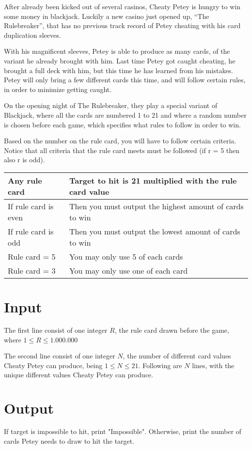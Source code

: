 
After already been kicked out of several casinos, Cheaty Petey is hungry to win some money in blackjack. Luckily a new casino just opened up, “The Rulebreaker”, that has no previous track record of Petey cheating with his card duplication sleeves.

With his magnificent sleeves, Petey is able to produce as many cards, of the variant he already brought with him. Last time Petey got caught cheating, he brought a full deck with him, but this time he has learned from his mistakes. Petey will only bring a few different cards this time, and will follow certain rules, in order to minimize getting caught.

On the opening night of The Rulebreaker, they play a special variant of Blackjack, where all the cards are numbered 1 to 21 and where a random number is chosen before each game, which specifies what rules to follow in order to win. 

Based on the number on the rule card, you will have to follow certain criteria. Notice that all criteria that the rule card meets must be followed (if r = 5 then also r is odd). 


\begin{tabular}{|ll|}
\hline
\textbf{Any rule card} & \textbf{Target to hit is 21 multiplied with the rule card value} \\ \hline
If rule card is even & Then you must output the highest amount of cards to win \\ \hline
If rule card is odd   & Then you must output the lowest amount of cards to win  \\ \hline
Rule card = 5         & You may only use 5 of each cards                        \\ \hline
Rule card = 3         & You may only use one of each card                       \\ \hline
\end{tabular}


\section*{Input}
The first line consist of one integer $R$, the rule card drawn before the game, where 
$1\leq R \leq 1.000.000$

The second line consist of one integer $N$, the number of different card values Cheaty Petey can produce, being $1\leq N \leq 21$. Following are $N$ lines, with the unique different values Cheaty Petey can produce.

\section*{Output}
If target is impossible to hit, print "Impossible". Otherwise, print the number of cards Petey needs to draw to hit the target.
